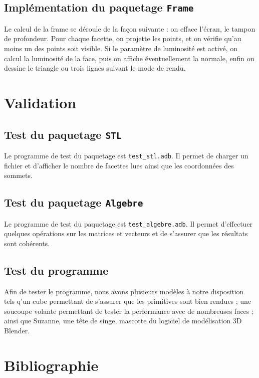 \documentclass[10pt]{article}
\begin{document}
\subsection{Implémentation du paquetage {\tt Frame}}
Le calcul de la frame se déroule de la façon suivante : on efface l'écran, le tampon de profondeur. Pour chaque facette, on projette les points, et on vérifie qu'au moins un des points soit visible. Si le paramètre de luminosité est activé, on calcul la luminosité de la face, puis on affiche éventuellement la normale, enfin on dessine le triangle ou trois lignes suivant le mode de rendu.





\section{Validation}

\subsection{Test du paquetage {\tt STL}}

Le programme de test du paquetage est \verb!test_stl.adb!. Il permet de charger un fichier et d'afficher le nombre de facettes lues ainsi que les coordonnées des sommets.

\subsection{Test du paquetage {\tt Algebre}}
Le programme de test du paquetage est \verb!test_algebre.adb!. Il permet d'effectuer quelques opérations sur les matrices et vecteurs et de s'assurer que les résultats sont cohérents.


\subsection{Test du programme}

Afin de tester le programme, nous avons plusieurs modèles à notre disposition tels q'un cube permettant de s'assurer que les primitives sont bien rendues ; une soucoupe volante permettant de tester la performance avec de nombreuses faces ; ainsi que Suzanne, une tête de singe, mascotte du logiciel de modélisation 3D Blender.


\section{Bibliographie}
\end{document}
